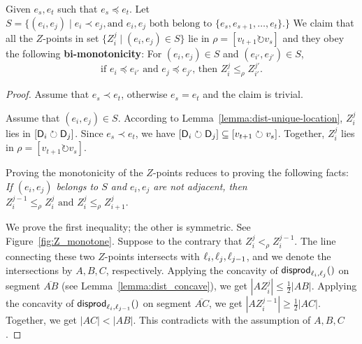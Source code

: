 \documentclass{ws-ijcga}
\begin{document}
\begin{lemma}\label{lemma:Z_bi-monotonicity}
Given $e_s,e_t$ such that $e_s\preceq e_t$. Let $S=\{(e_i,e_j)\mid e_i\prec e_j, \text{and $e_i,e_j$ both belong to $\{e_s,e_{s+1},\ldots,e_t\}$.}\}$
We claim that all the $Z$-points in set $\{Z_i^j\mid (e_i,e_j)\in S\}$ lie in $\rho=[v_{t+1} \circlearrowright v_s]$ and they obey the following \textbf{bi-monotonicity}:
For $(e_{i},e_{j})\in S$ and $(e_{i'},e_{j'})\in S$,
$$\text{if $e_{i}\preceq e_{i'}$ and $e_{j}\preceq e_{j'}$, then $Z_{i}^{j}\leq_\rho Z_{i'}^{j'}$}.$$
\end{lemma}

\begin{proof}
Assume that $e_s\prec e_t$, otherwise $e_s=e_t$ and the claim is trivial.

Assume that $(e_i,e_j)\in S$. According to Lemma~\ref{lemma:dist-unique-location}, $Z_i^j$ lies in $[\mathsf{D}_i\circlearrowright \mathsf{D}_j]$.
Since $e_s\prec e_t$, we have $[\mathsf{D}_i\circlearrowright \mathsf{D}_j]\subseteq [v_{t+1} \circlearrowright v_s]$.
Together, $Z_i^j$ lies in $\rho=[v_{t+1} \circlearrowright v_s]$.

Proving the monotonicity of the $Z$-points reduces to proving the following facts:
\emph{If $(e_i,e_j)$ belongs to $S$ and $e_i,e_j$ are not adjacent, then} $Z_i^{j-1}\leq_\rho Z_i^j\text{ and }Z_i^j \leq_\rho Z_{i+1}^j.$

We prove the first inequality; the other is symmetric.
See Figure~\ref{fig:Z_monotone}. Suppose to the contrary that $Z_i^j<_\rho Z_i^{j-1}$.
  The line connecting these two $Z$-points intersects with $\ell_i,\ell_j,\ell_{j-1}$, and we denote the intersections by $A,B,C$, respectively.
  Applying the concavity of $\mathsf{disprod}_{\ell_i,\ell_j}()$ on segment $\overline{AB}$ (see Lemma~\ref{lemma:dist_concave}), we get $|AZ_i^j|\leq \frac{1}{2}|AB|$.
  Applying the concavity of $\mathsf{disprod}_{\ell_i,\ell_{j-1}}()$ on segment $\overline{AC}$, we get $|AZ_i^{j-1}|\geq \frac{1}{2}|AC|$.
  Together, we get $|AC|<|AB|$. This contradicts with the assumption of $A,B,C$.
 \end{proof}
\end{document}

